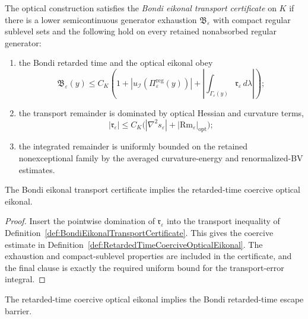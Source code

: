 \begin{definition}\label{def:BondiEikonalTransportCertificate}
The optical construction satisfies the \emph{Bondi eikonal transport certificate} on $K$ if there is a lower semicontinuous generator exhaustion $\mathfrak B_\varepsilon$ with compact regular sublevel sets and the following hold on every retained nonabsorbed regular generator:
\begin{enumerate}
    \item the Bondi retarded time and the optical eikonal obey
    \[
        \mathfrak B_\varepsilon(y)
        \le
        C_K\left(1+|u_{\mathscr I}(\Pi_\varepsilon^{\mathrm{reg}}(y))|
        +\left|\int_{\Gamma_\varepsilon(y)}\mathfrak r_\varepsilon\,d\lambda\right|\right);
    \]
    \item the transport remainder is dominated by optical Hessian and curvature terms,
    \[
        |\mathfrak r_\varepsilon|
        \le
        C_K\bigl(|\nabla^2s_\varepsilon|+|\mathrm{Rm}_\varepsilon|_{\mathrm{opt}}\bigr);
    \]
    \item the integrated remainder is uniformly bounded on the retained nonexceptional family by the averaged curvature-energy and renormalized-BV estimates.
\end{enumerate}
\end{definition}

\begin{proposition}\label{prop:BondiEikonalCertificateGate}
The Bondi eikonal transport certificate implies the retarded-time coercive optical eikonal.
\end{proposition}

\begin{proof}
Insert the pointwise domination of $\mathfrak r_\varepsilon$ into the transport inequality of Definition~\ref{def:BondiEikonalTransportCertificate}. This gives the coercive estimate in Definition~\ref{def:RetardedTimeCoerciveOpticalEikonal}. The exhaustion and compact-sublevel properties are included in the certificate, and the final clause is exactly the required uniform bound for the transport-error integral.
\end{proof}

\begin{lemma}\label{lem:CoerciveEikonalRetardedBarrier}
The retarded-time coercive optical eikonal implies the Bondi retarded-time escape barrier.
\end{lemma}

